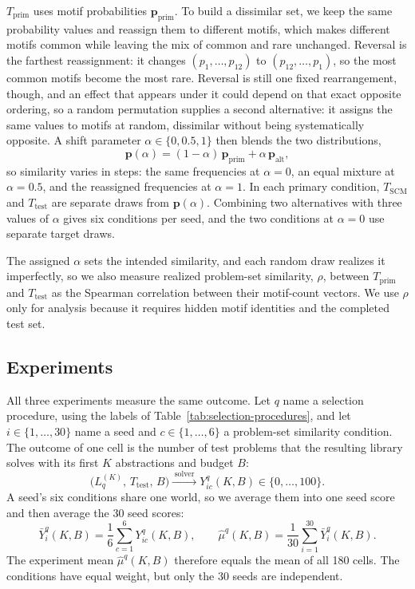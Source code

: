 \documentclass[10pt]{article}
\begin{document}
$T_{\mathrm{prim}}$ uses motif probabilities $\mathbf p_{\mathrm{prim}}$. To
build a dissimilar set, we keep the same probability values and reassign them
to different motifs, which makes different motifs common while leaving the
mix of common and rare unchanged. Reversal is the farthest reassignment: it
changes $(p_1,\ldots,p_{12})$ to $(p_{12},\ldots,p_1)$, so the most common
motifs become the most rare. Reversal is still one fixed rearrangement,
though, and an effect that appears under it could depend on that exact
opposite ordering, so a random permutation supplies a second alternative: it
assigns the same values to motifs at random, dissimilar without being
systematically opposite. A shift parameter $\alpha\in\{0,0.5,1\}$ then blends
the two distributions,
\[
  \mathbf p(\alpha)
    =(1-\alpha)\,\mathbf p_{\mathrm{prim}}
      +\alpha\,\mathbf p_{\mathrm{alt}},
\]
so similarity varies in steps: the same frequencies at $\alpha=0$, an equal
mixture at $\alpha=0.5$, and the reassigned frequencies at $\alpha=1$. In
each primary condition, $T_{\mathrm{SCM}}$ and $T_{\mathrm{test}}$ are
separate draws from $\mathbf p(\alpha)$. Combining two alternatives with
three values of $\alpha$ gives six conditions per seed, and the two
conditions at $\alpha=0$ use separate target draws.

The assigned $\alpha$ sets the intended similarity, and each random draw
realizes it imperfectly, so we also measure realized problem-set similarity,
$\rho$, between $T_{\mathrm{prim}}$ and $T_{\mathrm{test}}$ as the Spearman
correlation between their motif-count vectors. We use $\rho$ only for
analysis because it requires hidden motif identities and the completed test
set.

\subsection{Experiments}

All three experiments measure the same outcome. Let $q$ name a selection
procedure, using the labels of Table~\ref{tab:selection-procedures}, and let
$i\in\{1,\ldots,30\}$ name a seed and $c\in\{1,\ldots,6\}$ a problem-set
similarity condition. The outcome of one cell is the number of test problems
that the resulting library solves with its first $K$ abstractions and budget
$B$:
\[
  \bigl(L_q^{(K)},\,T_{\mathrm{test}},\,B\bigr)
  \xrightarrow{\;\text{solver}\;}
  Y_{ic}^{q}(K,B)\in\{0,\ldots,100\}.
\]
A seed's six conditions share one world, so we average them into one seed
score and then average the 30 seed scores:
\begin{equation}
  \bar Y_i^{q}(K,B)=\frac{1}{6}\sum_{c=1}^{6}Y_{ic}^{q}(K,B),
  \qquad
  \widehat\mu^{q}(K,B)=\frac{1}{30}\sum_{i=1}^{30}\bar Y_i^{q}(K,B).
\end{equation}
The experiment mean $\widehat\mu^{q}(K,B)$ therefore equals the mean of all
180 cells. The conditions have equal weight, but only the 30 seeds are
independent.
\end{document}
